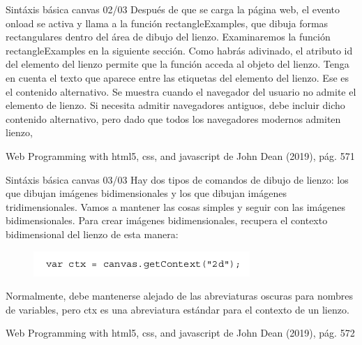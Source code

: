 \begin{frame}{Sintáxis básica canvas 02/03}
\justifying
Después de que se carga la página web, el evento onload se activa y llama a la función rectangleExamples, que dibuja formas rectangulares dentro del área de dibujo del lienzo. Examinaremos la función rectangleExamples en la siguiente sección. Como habrás adivinado, el atributo id del elemento del lienzo permite que la función acceda al objeto del lienzo. Tenga en cuenta el texto que aparece entre las etiquetas del elemento del lienzo. Ese es el contenido alternativo. Se muestra cuando el navegador del usuario no admite el elemento de lienzo. Si necesita admitir navegadores antiguos, debe incluir dicho contenido alternativo, pero dado que todos los navegadores modernos admiten lienzo,

{\tiny Web Programming with html5, css, and javascript de John Dean (2019), pág. 571}
\end{frame}

\begin{frame}{Sintáxis básica canvas 03/03}
\justifying
Hay dos tipos de comandos de dibujo de lienzo: los que dibujan imágenes bidimensionales y los que dibujan imágenes tridimensionales. Vamos a mantener las cosas simples y seguir con las imágenes bidimensionales. Para crear imágenes bidimensionales, recupera el contexto bidimensional del lienzo de esta manera:

\begin{figure}[H]
\centering
\includegraphics[scale=0.5]{Section_Files/images/Sec01/02.png}
\end{figure}

Normalmente, debe mantenerse alejado de las abreviaturas oscuras para nombres de variables, pero ctx es una abreviatura estándar para el contexto de un lienzo.

{\tiny Web Programming with html5, css, and javascript de John Dean (2019), pág. 572}
\end{frame}


